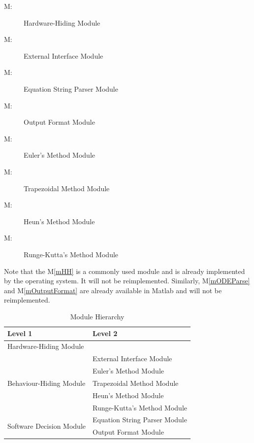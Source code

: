 \documentclass[12pt, titlepage]{article}
\newcounter{mnum}
\newcommand{\mthemnum}{M\themnum}
\begin{document}
\begin{description}
\item [ \mthemnum \label{mHH}:] Hardware-Hiding Module
\item [ \mthemnum \label{mExt}:] External Interface Module
\item [ \mthemnum \label{mODEParse}:] Equation String Parser Module
\item [ \mthemnum \label{mOutputFormat}:] Output Format Module
\item [ \mthemnum \label{mEuler}:] Euler's Method Module
\item [ \mthemnum \label{mTrap}:] Trapezoidal Method Module
\item [ \mthemnum \label{mHeun}:] Heun's Method Module
\item [ \mthemnum \label{mRK}:] Runge-Kutta's Method Module

\end{description}

Note that the M\ref{mHH} is a commonly used module and is already implemented by the operating system. It will not be reimplemented.
Similarly, M\ref{mODEParse} and M\ref{mOutputFormat} are already available in Matlab and will not be reimplemented.

\begin{table}[H]
\centering
\begin{tabular}{p{} p{}}
\toprule
\textbf{Level 1} & \textbf{Level 2}\\
\midrule

{Hardware-Hiding Module} & ~ \\
\midrule

\multirow{5}{0.3\textwidth}{Behaviour-Hiding Module} & External Interface Module\\
& Euler's Method Module\\
& Trapezoidal Method Module\\
& Heun's Method Module\\
& Runge-Kutta's Method Module\\
\midrule

\multirow{2}{0.3\textwidth}{Software Decision Module} & {Equation String Parser Module}\\
& Output Format Module\\
\bottomrule

\end{tabular}
\caption{Module Hierarchy}
\label{TblMH}
\end{table}
\end{document}
